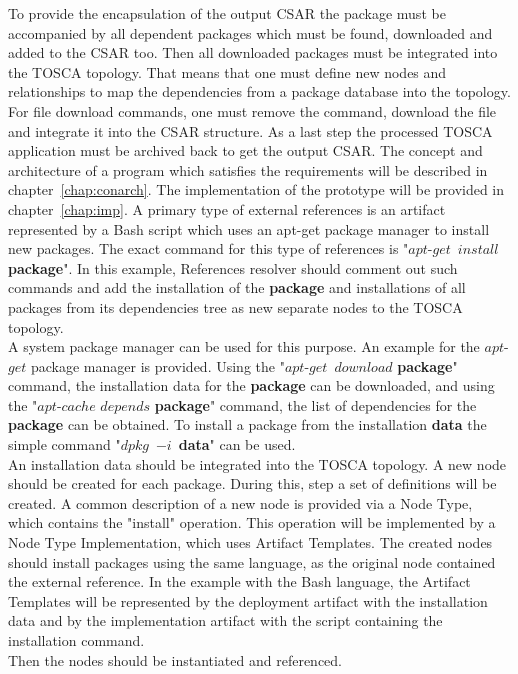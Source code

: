 To provide the encapsulation of the output CSAR the package must be accompanied by all dependent packages which must be found, downloaded and added to the CSAR too.
Then all downloaded packages must be integrated into the TOSCA topology.
That means that one must define new nodes and relationships to map the dependencies from a package database into the topology.
For file download commands, one must remove the command, download the file and integrate it into the CSAR structure.
As a last step the processed TOSCA application must be archived back to get the output CSAR.
The concept and architecture of a program which satisfies the requirements will be described in chapter~\ref{chap:conarch}.
The implementation of the prototype will be provided in chapter~\ref{chap:imp}.
A primary type of external references is an artifact represented by a Bash script which uses an apt-get package manager to install new packages.
The exact command for this type of references is "$apt$-$get$~$install$ \textbf{package}".
In this example, References resolver should comment out such commands and add the installation of the \textbf{package} and installations of all packages from its dependencies tree as new separate nodes to the TOSCA topology. \\
A system package manager can be used for this purpose. 
An example for the $apt$-$get$ package manager is provided. 
Using the "$apt$-$get$~$download$ \textbf{package}" command, the installation data for the \textbf{package} can be downloaded, and using the "$apt$-$cache$ $depends$ \textbf{package}" command, the list of dependencies for the \textbf{package} can be obtained. 
To install a package from the installation \textbf{data} the simple command "$dpkg$~$-i$~\textbf{data}" can be used.\\
An installation data should be integrated into the TOSCA topology. 
A new node should be created for each package. 
During this, step a set of definitions will be created.
A common description of a new node is provided via a Node Type, which contains the "install" operation. 
This operation will be implemented by a Node Type Implementation, which uses Artifact Templates.
The created nodes should install packages using the same language, as the original node contained the external reference.
In the example with the Bash language, the Artifact Templates will be represented by the deployment artifact with the installation data and by the implementation artifact with the script containing the installation command. \\
Then the nodes should be instantiated and referenced.
